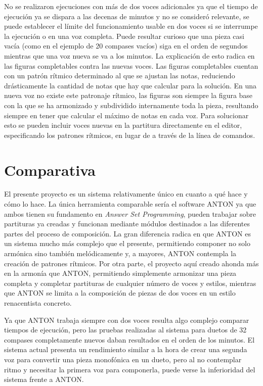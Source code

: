 No se realizaron ejecuciones con más de dos voces adicionales ya que el tiempo de ejecución ya se dispara a las decenas de minutos y no se consideró relevante, se puede establecer el límite del funcionamiento usable en dos voces si se interrumpe la ejecución o en una voz completa. Puede resultar curioso que una pieza casi vacía (como en el ejemplo de 20 compases vacíos) siga en el orden de segundos mientras que una voz nueva se va a los minutos. La explicación de esto radica en las figuras completables contra las nuevas voces. Las figuras completables cuentan con un patrón rítmico determinado al que se ajustan las notas, reduciendo drásticamente la cantidad de notas que hay que calcular para la solución. En una nueva voz no existe este patronaje rítmico, las figuras son siempre la figura base con la que se ha armonizado y subdividido internamente toda la pieza, resultando siempre en tener que calcular el máximo de notas en cada voz. Para solucionar esto se pueden incluir voces nuevas en la partitura directamente en el editor, especificando los patrones rítmicos, en lugar de a través de la línea de comandos.

\section{Comparativa}
El presente proyecto es un sistema relativamente único en cuanto a qué hace y cómo lo hace. La única herramienta comparable sería el software ANTON \cite{anton-composing} ya que ambos tienen su fundamento en \textit{Answer Set Programming}, pueden trabajar sobre partituras ya creadas y funcionan mediante módulos destinados a las diferentes partes del proceso de composición. La gran diferencia radica en que ANTON es un sistema mucho más complejo que el presente, permitiendo componer no solo armónica sino también melódicamente y, a mayores, ANTON contempla la creación de patrones rítmicos. Por otra parte, el proyecto aquí creado ahonda más en la armonía que ANTON, permitiendo simplemente armonizar una pieza completa y completar partituras de cualquier número de voces y estilos, mientras que ANTON se limita a la composición de piezas de dos voces en un estilo renacentista concreto.

Ya que ANTON trabaja siempre con dos voces resulta algo complejo comparar tiempos de ejecución, pero las pruebas realizadas al sistema para duetos de 32 compases completamente nuevos daban resultados en el orden de los minutos. El sistema actual presenta un rendimiento similar a la hora de crear una segunda voz para convertir una pieza monofónica en un dueto, pero al no contemplar ritmo y necesitar la primera voz para componerla, puede verse la inferioridad del sistema frente a ANTON.

